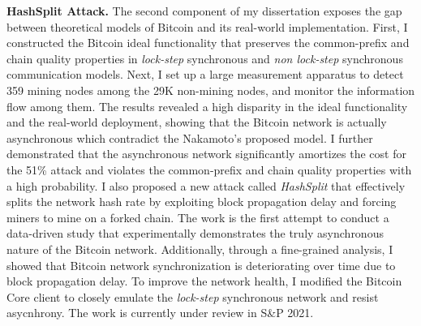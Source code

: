 \documentclass{NSF}
\newcommand{\BfPara}[1]{{\noindent\textbf{#1.}}\xspace}
\begin{document}
\BfPara{HashSplit Attack} The second component of my dissertation exposes the gap between theoretical models of Bitcoin and its real-world implementation. First, I constructed the Bitcoin ideal functionality that preserves the common-prefix and chain quality properties in {\em lock-step} synchronous and {\em non lock-step} synchronous communication models. Next, I set up a large measurement apparatus to detect 359 mining nodes among the 29K non-mining nodes, and monitor the information flow among them. The results revealed a high disparity in the ideal functionality and the real-world deployment, showing that the Bitcoin network is actually asynchronous which contradict the Nakamoto's proposed model. I further demonstrated that the asynchronous network significantly amortizes the cost for the 51\% attack and violates the common-prefix and chain quality properties with a high probability. I also proposed a new attack called {\em HashSplit} that effectively splits the network hash rate by exploiting block propagation delay and forcing miners to mine on a forked chain. The work is the first attempt to conduct a data-driven study that experimentally demonstrates the truly asynchronous nature of the Bitcoin network. Additionally, through a fine-grained analysis, I showed that Bitcoin network synchronization is deteriorating over time due to block propagation delay. To improve the network health, I modified the Bitcoin Core client to closely emulate the {\em lock-step} synchronous network and resist asycnhrony. The work is currently under review in S\&P 2021. 
\end{document}
